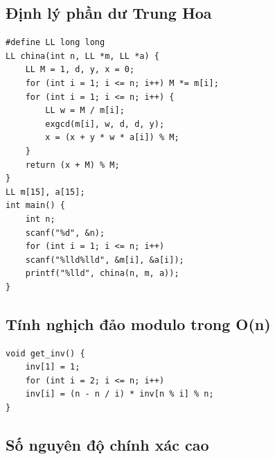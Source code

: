 \documentclass[11pt]{article}
\begin{document}
\subsection{Định lý phần dư Trung Hoa}

\begingroup
\footnotesize
\begin{verbatim}
#define LL long long
LL china(int n, LL *m, LL *a) {
    LL M = 1, d, y, x = 0;
    for (int i = 1; i <= n; i++) M *= m[i];
    for (int i = 1; i <= n; i++) {
        LL w = M / m[i];
        exgcd(m[i], w, d, d, y);
        x = (x + y * w * a[i]) % M;
    }
    return (x + M) % M;
}
LL m[15], a[15];
int main() {
    int n;
    scanf("%d", &n);
    for (int i = 1; i <= n; i++)
    scanf("%lld%lld", &m[i], &a[i]);
    printf("%lld", china(n, m, a));
}
\end{verbatim}
\endgroup

\subsection{Tính nghịch đảo modulo trong O(n)}

\begingroup
\footnotesize
\begin{verbatim}
void get_inv() {
    inv[1] = 1;
    for (int i = 2; i <= n; i++)
    inv[i] = (n - n / i) * inv[n % i] % n;
}
\end{verbatim}
\endgroup

\subsection{Số nguyên độ chính xác cao}
\end{document}
